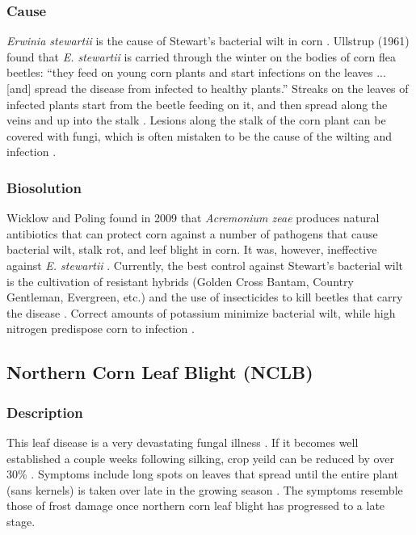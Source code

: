 \documentclass[12pt]{article}
\begin{document}
\subsubsection{Cause}

\emph{Erwinia stewartii} is the cause of Stewart's bacterial wilt in corn \autocite{ullstrup1961corn}. Ullstrup (1961) found that \emph{E. stewartii} is carried through the winter on the bodies of corn flea beetles: ``they feed on young corn plants and start infections on the leaves ... [and] spread the disease from infected to healthy plants.'' Streaks on the leaves of infected plants start from the beetle feeding on it, and then spread along the veins and up into the stalk \autocite{robert1967bacterial}. Lesions along the stalk of the corn plant can be covered with fungi, which is often mistaken to be the cause of the wilting and infection \autocite{ullstrup1961corn}.

\subsubsection{Biosolution}

Wicklow and Poling found in 2009 that \emph{Acremonium zeae} produces natural antibiotics that can protect corn against a number of pathogens that cause bacterial wilt, stalk rot, and leef blight in corn. It was, however, ineffective against \emph{E. stewartii} \autocite{wicklow2009antimicrobial}. Currently, the best control against Stewart's bacterial wilt is the cultivation of resistant hybrids (Golden Cross Bantam, Country Gentleman, Evergreen, etc.) and the use of insecticides to kill beetles that carry the disease \autocite{ullstrup1961corn}. Correct amounts of potassium minimize bacterial wilt, while high nitrogen predispose corn to infection \autocite{ullstrup1961corn}.


\subsection{Northern Corn Leaf Blight (NCLB)}

\subsubsection{Description}

This leaf disease is a very devastating fungal illness \autocite{zhang2021klebsiella}. If it becomes well established a couple weeks following silking, crop yeild can be reduced by over 30\% \autocite{ullstrup1961corn}. Symptoms include long spots on leaves that spread until the entire plant (sans kernels) is taken over late in the growing season \autocite{ullstrup1961corn}. The symptoms resemble those of frost damage once northern corn leaf blight has progressed to a late stage.
\end{document}
